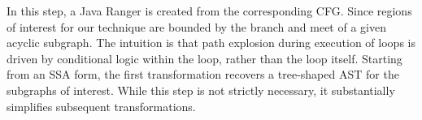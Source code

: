 %

In this step, a Java Ranger is created from the corresponding CFG. Since regions of interest for our technique are bounded by the branch and meet of a given acyclic subgraph.  The intuition is that path explosion during execution of loops is driven by conditional logic within the loop, rather than the loop itself.
Starting from an SSA form, the first transformation recovers a tree-shaped AST for the subgraphs of interest.  While this step is not strictly necessary, it substantially simplifies subsequent transformations.  

